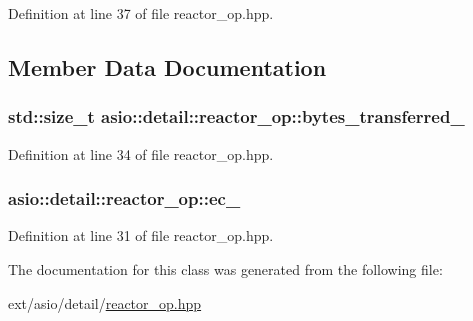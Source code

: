 Definition at line 37 of file reactor\+\_\+op.\+hpp.



\subsection{Member Data Documentation}
\hypertarget{classasio_1_1detail_1_1reactor__op_a721fcf0d5ad569136e6f7a384b1311fc}{}
\subsubsection[{bytes\+\_\+transferred\+\_\+}]{\setlength{\rightskip}{0pt plus 5cm}std\+::size\+\_\+t asio\+::detail\+::reactor\+\_\+op\+::bytes\+\_\+transferred\+\_\+}\label{classasio_1_1detail_1_1reactor__op_a721fcf0d5ad569136e6f7a384b1311fc}


Definition at line 34 of file reactor\+\_\+op.\+hpp.

\hypertarget{classasio_1_1detail_1_1reactor__op_a1d4d635e42b05dd18f11b17c99ec7ed4}{}
\subsubsection[{ec\+\_\+}]{ asio\+::detail\+::reactor\+\_\+op\+::ec\+\_\+}\label{classasio_1_1detail_1_1reactor__op_a1d4d635e42b05dd18f11b17c99ec7ed4}


Definition at line 31 of file reactor\+\_\+op.\+hpp.



The documentation for this class was generated from the following file\+:\begin{DoxyCompactItemize}
\item 
ext/asio/detail/\hyperlink{reactor__op_8hpp}{reactor\+\_\+op.\+hpp}\end{DoxyCompactItemize}
